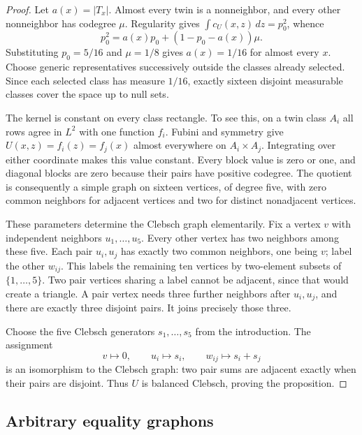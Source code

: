 \begin{proof}
Let $a(x)=|T_x|$. Almost every twin is a nonneighbor, and every other
nonneighbor has codegree $\mu$. Regularity gives
$\int c_U(x,z)\,dz=p_0^2$, whence
\[
 p_0^2=a(x)p_0+(1-p_0-a(x))\mu.
\]
Substituting $p_0=5/16$ and $\mu=1/8$ gives $a(x)=1/16$ for almost every
$x$. Choose generic representatives successively outside the classes already
selected. Since each selected class has measure $1/16$, exactly sixteen
disjoint measurable classes cover the space up to null sets.

The kernel is constant on every class rectangle. To see this, on a twin
class $A_i$ all rows agree in $L^2$ with one function $f_i$. Fubini and
symmetry give $U(x,z)=f_i(z)=f_j(x)$ almost everywhere on $A_i\times A_j$.
Integrating over either coordinate makes this value constant. Every block
value is zero or one, and diagonal blocks are zero because their pairs have
positive codegree. The quotient is consequently a simple graph on sixteen
vertices, of degree five, with zero common neighbors for adjacent vertices
and two for distinct nonadjacent vertices.

These parameters determine the Clebsch graph elementarily. Fix a vertex
$v$ with independent neighbors $u_1,\ldots,u_5$. Every other vertex has two
neighbors among these five. Each pair $u_i,u_j$ has exactly two common
neighbors, one being $v$; label the other $w_{ij}$. This labels the remaining
ten vertices by two-element subsets of $\{1,\ldots,5\}$. Two pair vertices
sharing a label cannot be adjacent, since that would create a triangle. A
pair vertex needs three further neighbors after $u_i,u_j$, and there are
exactly three disjoint pairs. It joins precisely those three.

Choose the five Clebsch generators $s_1,\ldots,s_5$ from the introduction.
The assignment
\[
 v\mapsto0,\qquad u_i\mapsto s_i,\qquad w_{ij}\mapsto s_i+s_j
\]
is an isomorphism to the Clebsch graph: two pair sums are adjacent exactly
when their pairs are disjoint. Thus $U$ is balanced Clebsch, proving the
proposition.
\end{proof}

\subsection{Arbitrary equality graphons}

